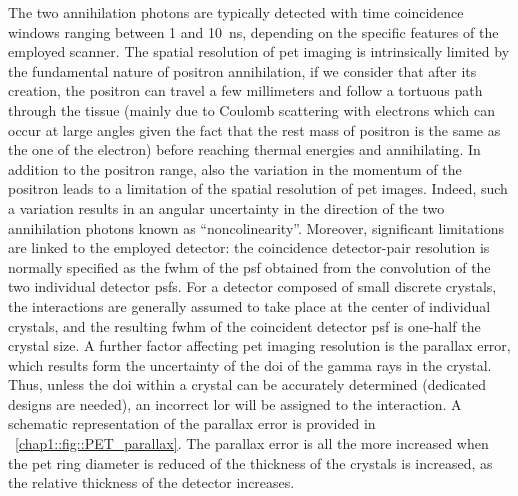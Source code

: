 The two annihilation photons are typically detected with time coincidence windows ranging between 1 and 10~ns, depending on the specific features of the employed scanner. The spatial resolution of \gls{pet} imaging is intrinsically limited by the fundamental nature of positron annihilation, if we consider that after its creation, the positron can travel a few millimeters and follow a tortuous path through the tissue (mainly due to Coulomb scattering with electrons which can occur at large angles given the fact that the rest mass of positron is the same as the one of the electron) before reaching thermal energies and annihilating. In addition to the positron range, also the variation in the momentum of the positron leads to a limitation of the spatial resolution of \gls{pet} images. Indeed, such a variation results in an angular uncertainty in the direction of the two annihilation photons known as \enquote{noncolinearity}. Moreover, significant limitations are linked to the employed detector: the coincidence detector-pair resolution is normally specified as the \gls{fwhm} of the \gls{psf} obtained from the convolution of the two individual detector \glspl{psf}. For a detector composed of small discrete crystals, the interactions are generally assumed to take place at the center of individual crystals, and the resulting \gls{fwhm} of the coincident detector \gls{psf} is one-half the crystal size. A further factor affecting \gls{pet} imaging resolution is the parallax error, which results form the uncertainty of the \gls{doi} of the gamma rays in the crystal. Thus, unless the \gls{doi} within a crystal can be accurately determined (dedicated designs are needed), an incorrect \gls{lor} will be assigned to the interaction. A schematic representation of the parallax error is provided in \figurename~\ref{chap1::fig::PET_parallax}. The parallax error is all the more increased when the \gls{pet} ring diameter is reduced of the thickness of the crystals is increased, as the relative thickness of the detector increases. 

